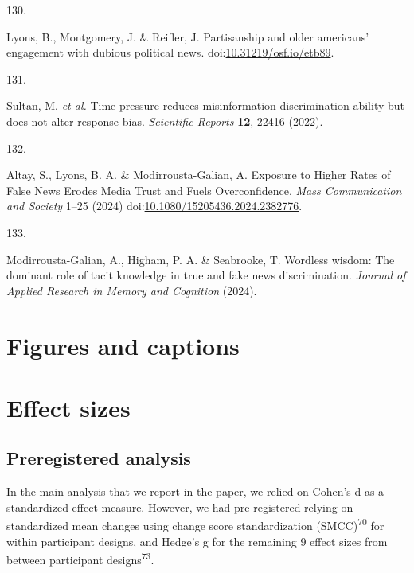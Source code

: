 \documentclass[
  man]{apa6}
\newlength{\cslhangindent}
\newlength{\csllabelwidth}
\newenvironment{CSLReferences}[2] %
 {\begin{list}{}{%
  \setlength{\itemindent}{0pt}
  \setlength{\leftmargin}{0pt}
  \setlength{\parsep}{0pt}
  \ifodd #1
   \setlength{\leftmargin}{\cslhangindent}
   \setlength{\itemindent}{-1\cslhangindent}
  \fi
  \setlength{\itemsep}{#2\baselineskip}}}
 {\end{list}}
\newcommand{\CSLLeftMargin}[1]{\parbox[t]{\csllabelwidth}{\strut#1\strut}}
\newcommand{\CSLRightInline}[1]{\parbox[t]{\linewidth - \csllabelwidth}{\strut#1\strut}}
\begin{document}
\begin{CSLReferences}{0}{0}
\CSLLeftMargin{130. }%
\CSLRightInline{*Lyons, B., Montgomery, J. \& Reifler, J. Partisanship and older americans{'} engagement with dubious political news. doi:\href{https://doi.org/10.31219/osf.io/etb89}{10.31219/osf.io/etb89}.}

\CSLLeftMargin{131. }%
\CSLRightInline{*Sultan, M. \emph{et al.} \href{https://doi.org/10.1038/s41598-022-26209-8}{Time pressure reduces misinformation discrimination ability but does not alter response bias}. \emph{Scientific Reports} \textbf{12}, 22416 (2022).}

\CSLLeftMargin{132. }%
\CSLRightInline{*Altay, S., Lyons, B. A. \& Modirrousta-Galian, A. Exposure to Higher Rates of False News Erodes Media Trust and Fuels Overconfidence. \emph{Mass Communication and Society} 1--25 (2024) doi:\href{https://doi.org/10.1080/15205436.2024.2382776}{10.1080/15205436.2024.2382776}.}

\CSLLeftMargin{133. }%
\CSLRightInline{*Modirrousta-Galian, A., Higham, P. A. \& Seabrooke, T. Wordless wisdom: The dominant role of tacit knowledge in true and fake news discrimination. \emph{Journal of Applied Research in Memory and Cognition} (2024).}

\end{CSLReferences}

\endgroup
\newpage

\section{Figures and captions}\label{figures-and-captions}

\newpage

\appendix


\section{Effect sizes}\label{effect-sizes}

\subsection{Preregistered analysis}\label{preregistered-analysis}

\FloatBarrier

In the main analysis that we report in the paper, we relied on Cohen's d as a standardized effect measure. However, we had pre-registered relying on standardized mean changes using change score standardization (SMCC)\textsuperscript{70} for within participant designs, and Hedge's g for the remaining 9 effect sizes from between participant designs\textsuperscript{73}.
\end{document}
